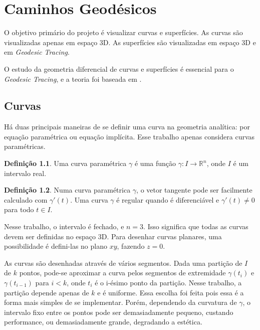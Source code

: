 \chapter{Caminhos Geodésicos}
\label{geomdiff}

\theoremstyle{definition}
\newtheorem{thm}{Definição}
\newtheorem{defCurveParam}[thm]{Definição}
\newtheorem{defCurveReg}[thm]{Definição}
\newtheorem{defSurfParamReg}[thm]{Definição}
\newtheorem{defSurfForm}[thm]{Definição}
\newtheorem{defSurfRotate}[thm]{Definição}
\newtheorem{defSurfParallel}[thm]{Definição}
\newtheorem{defSurfGeodesic}[thm]{Definição}

O objetivo primário do projeto é visualizar curvas e superfícies.
As curvas são visualizadas apenas em espaço 3D.
As superfícies são visualizadas em espaço 3D e em \textit{Geodesic Tracing}.

O estudo da geometria diferencial de curvas e superfícies é
essencial para o \textit{Geodesic Tracing}, e a teoria foi baseada em \cite{GeomDiff:1}.

\section{Curvas}
Há duas principais maneiras de se definir uma curva na geometria analítica:
por equação paramétrica ou equação implícita.
Esse trabalho apenas considera curvas paramétricas.

\begin{defCurveParam}
Uma curva paramétrica $\gamma$ é uma função $\gamma : I \rightarrow \mathbb{R}^n$, onde $I$ é um intervalo real.
\end{defCurveParam}

\begin{defCurveReg}
Numa curva paramétrica $\gamma$, o vetor tangente pode ser facilmente calculado com $\gamma'(t)$.
Uma curva $\gamma$ é regular quando é diferenciável e $\gamma'(t) \neq 0$ para todo $t \in I$.
\end{defCurveReg}

Nesse trabalho, o intervalo é fechado, e $n=3$. Isso significa que todas as
curvas devem ser definidas no espaço 3D. Para desenhar curvas planares,
uma possibilidade é defini-las no plano $xy$, fazendo $z=0$.

As curvas são desenhadas através de vários segmentos.
Dada uma partição de $I$ de $k$ pontos,
pode-se aproximar a curva pelos segmentos de extremidade $\gamma(t_{i})$ e $\gamma(t_{i-1})$ para $i<k$,
onde $t_i$ é o i-ésimo ponto da partição.
Nesse trabalho, a partição depende apenas de $k$ e é uniforme.
Essa escolha foi feita pois essa é a forma mais simples de se implementar.
Porém, dependendo da curvatura de $\gamma$, o intervalo fixo entre os pontos pode
ser demasiadamente pequeno, custando performance, ou demasiadamente grande,
degradando a estética.

